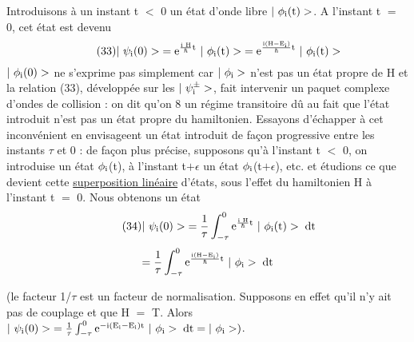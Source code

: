 Introduisons à un instant t $<$ 0 un état d'onde libre 
$|\ \phi_\mt{i}(\mt{t})>$. A l'instant t $=$ 0, cet état est devenu
\[
\tag{33}|\ \psi_\mt{i}(0)>\;=\mt{e}^{\frac{\mt{i H}}{\hbar}\mt{t}}\ |\ \phi_\mt{i}(\mt{t})>\;=
\mt{e}^{\frac{\mt{i(H}-\mt{E}_\mt{i})}{\hbar}\mt{t}}\ |\ \phi_\mt{i}(\mt{t})>
\]
$|\ \phi_\mt{i}(0)>$ ne s'exprime pas simplement car $|\ \phi_{\text{i}}>$ n'est pas un état propre
de H et la relation (33), développée sur les $|\ \psi_{\text{i}}^\pm>$, fait intervenir un
paquet complexe d'ondes de collision : on dit qu'on 8 un régime transitoire
dû au fait que l'état introduit n'est pas un état propre du hamiltonien.
Essayons d'échapper à cet inconvénient en envisageent un état introduit
de façon progressive entre les instants $\tau$ et 0 : de façon plus précise,
supposons qu'à l'instant t $<$ 0, on introduise un état $\phi_{\text{i}}$(t), à l'instant
t$+\epsilon$ un état $\phi_{\text{i}}$(t$+\epsilon$), etc. et étudions ce que devient cette
\ul{superposition linéaire} d'états, sous l'effet du hamiltonien H à l'instant t $=$ 0.
Nous obtenons un état
\[
\tag{34}|\ \psi_\mt{i}(0)>\;=\frac{1}{\tau}\int_{-\tau}^0\mt{e}^{\frac{\mt{i H}}{\hbar}\mt{t}}\ |\ \phi_\mt{i}(\mt{t})>\;\mt{dt}
\]
\[
=\frac{1}{\tau}\int_{-\tau}^0
\mt{e}^{\frac{\mt{i(H}-\mt{E}_\mt{i})}{\hbar}\mt{t}}\ |\ \phi_\mt{i}>\;\mt{dt}
\]

(le facteur 1/$\tau$ est un facteur de normalisation. Supposons en effet qu'il
n'y ait pas de couplage et que H $=$ T. Alors
$|\ \psi_\mt{i}(0)>\;=\frac{1}{\tau}\int_{-\tau}^0\mt{e}^{-\mt{i}(\mt{E}_\mt{i}-\mt{E}_\mt{i})\mt{t}}\ |\ \phi_\mt{i}>\;\mt{dt}=|\ \phi_\mt{i}>)$.

